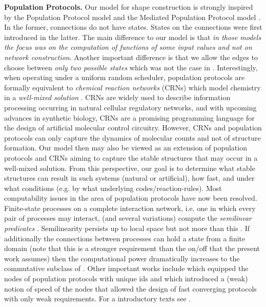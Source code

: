 \documentclass[oribibl, 11pt]{llncs}
\begin{document}
\noindent\textbf{Population Protocols.} Our model for shape construction is strongly inspired by the Population Protocol model \cite{AADFP06} and the Mediated Population Protocol model \cite{MCS11-2}. In the former, connections do not have states. States on the connections were first introduced in the latter. The main difference to our model is that \emph{in those models the focus was on the computation of functions of some input values and not on network construction}. Another important difference is that we allow the edges to choose between \emph{only two possible states} which was not the case in \cite{MCS11-2}. Interestingly, when operating under a uniform random scheduler, population protocols are formally equivalent to \emph{chemical reaction networks} (CRNs) which model chemistry in a \emph{well-mixed solution} \cite{Do14}. CRNs are widely used to describe information processing occurring in natural cellular regulatory networks, and with upcoming advances in synthetic biology, CRNs are a promising programming language for the design of artificial molecular control circuitry. However, CRNs and population protocols can only capture the dynamics of molecular counts and not of structure formation. Our model then may also be viewed as an extension of population protocols and CRNs aiming to capture the stable structures that may occur in a well-mixed solution. From this perspective, our goal is to determine what stable structures can result in such systems (natural or artificial), how fast, and under what conditions (e.g. by what underlying codes/reaction-rules). Most computability issues in the area of population protocols have now been resolved. Finite-state processes on a complete interaction network, i.e. one in which every pair of processes may interact, (and several variations) compute the \emph{semilinear predicates} \cite{AAER07}. Semilinearity persists up to  local space but not more than this \cite{MNPS11}.  If additionally the connections between processes can hold a state from a finite domain (note that this is a stronger requirement than the on/off that the present work assumes) then the computational power dramatically increases to the commutative subclass of  \cite{MCS11-2}. Other important works include \cite{GR09} which equipped the nodes of population protocols with unique ids and \cite{BBCK10} which introduced a (weak) notion of speed of the nodes that allowed the design of fast converging protocols with only weak requirements. For a introductory texts see \cite{AR07,MCS11}.\\ 
\end{document}
